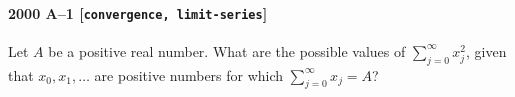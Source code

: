 \paragraph{2000 A--1 \textnormal{[\texttt{convergence, limit-series}]}}
Let $A$ be a positive real number. What are the possible values of
$\sum_{j=0}^\infty x_j^2$, given that $x_0,x_1,\ldots$ are positive
numbers
for which $\sum_{j=0}^\infty x_j=A$?
